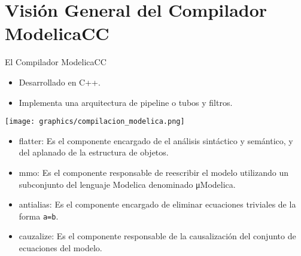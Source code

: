 \section{Visión General del Compilador ModelicaCC}

\begin{frame}[fragile]{El Compilador ModelicaCC}
    \begin{itemize} 
        \item<1-> Desarrollado en C++. 
        \item<2-> Implementa una arquitectura de pipeline o tubos y filtros.
    \end{itemize}
    \pause
    \begin{center}
        \texttt{[image: graphics/compilacion\_modelica.png]}
    \end{center}
    \begin{itemize} 
        \item<4-> flatter: Es el componente encargado de el análisis sintáctico y semántico, y del aplanado de la estructura de objetos. 
        \item<5-> mmo: Es el componente responsable de reescribir el modelo utilizando un subconjunto del lenguaje Modelica denominado μModelica.
        \item<6-> antialias: Es el componente encargado de eliminar ecuaciones triviales de la forma \verb+a=b+.
        \item<7-> cauzalize: Es el componente responsable de la causalización del conjunto de ecuaciones del modelo.
    \end{itemize}
\end{frame}